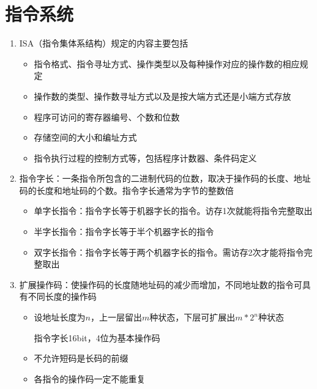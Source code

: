 \documentclass[./computer-organization-and-architecture.tex]{subfiles}
\begin{document}
    \section{指令系统}

    \begin{enumerate}
        \item ISA（指令集体系结构）规定的内容主要包括
        \begin{itemize}
            \item 指令格式、指令寻址方式、操作类型以及每种操作对应的操作数的相应规定
            \item 操作数的类型、操作数寻址方式以及是按大端方式还是小端方式存放
            \item 程序可访问的寄存器编号、个数和位数
            \item 存储空间的大小和编址方式
            \item 指令执行过程的控制方式等，包括程序计数器、条件码定义
        \end{itemize}
        \item 指令字长：一条指令所包含的二进制代码的位数，取决于操作码的长度、地址码的长度和地址码的个数。指令字长通常为字节的整数倍
        \begin{itemize}
            \item 单字长指令：指令字长等于机器字长的指令。访存1次就能将指令完整取出
            \item 半字长指令：指令字长等于半个机器字长的指令
            \item 双字长指令：指令字长等于两个机器字长的指令。需访存2次才能将指令完整取出
        \end{itemize}
        \item 扩展操作码：使操作码的长度随地址码的减少而增加，不同地址数的指令可具有不同长度的操作码
        \begin{itemize}
            \item 设地址长度为$n$，上一层留出$m$种状态，下层可扩展出$m * 2^n$种状态
            \begin{analysisbox}
                指令字长16bit，4位为基本操作码
            \end{analysisbox}
            \item 不允许短码是长码的前缀
            \item 各指令的操作码一定不能重复
        \end{itemize}
    \end{enumerate}
\end{document}
